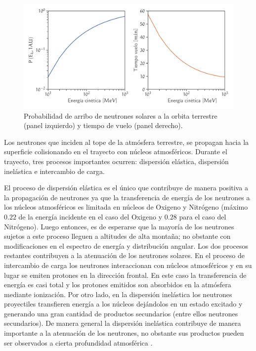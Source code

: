 \begin{figure}
        \centering
        \includegraphics[width=\textwidth]{neutron-prob.pdf}
        \caption{Probabilidad de arribo de neutrones solares a la orbita terrestre (panel izquierdo) y tiempo de vuelo (panel derecho).}
        \label{fig:neutron-prob}
\end{figure}

Los neutrones que inciden al tope de la atmósfera terrestre, se propagan hacia la superficie colisionando en el trayecto con núcleos atmosféricos. Durante el trayecto, tres procesos importantes ocurren: dispersión elástica, dispersión inelástica e intercambio de carga.

El proceso de dispersión elástica es el único que contribuye de manera positiva a la propagación de neutrones ya que la transferencia de energía de los neutrones a los núcleos atmosféricos es limitada en núcleos de Oxigeno y Nitrógeno (máximo $0.22$ de la energía incidente en el caso del Oxigeno y $0.28$ para el caso del Nitrógeno). Luego entonces, es de esperarse que la mayoría de los neutrones sujetos a este proceso lleguen a altitudes de alta montaña; no obstante con modificaciones en el espectro de energía y distribución angular. Los dos procesos restantes contribuyen a la atenuación de los neutrones solares. En el proceso de intercambio de carga los neutrones interaccionan con núcleos atmosféricos y en su lugar se emiten protones en la dirección frontal. En este caso la transferencia de energía es casi total y los protones emitidos son absorbidos en la atmósfera mediante ionización. Por otro lado, en la dispersión inelástica los neutrones proyectiles transfieren energía a los núcleos dejándolos en un estado excitado y generando una gran cantidad de productos secundarios (entre ellos neutrones secundarios). De manera general la dispersión inelástica contribuye de manera importante a la atenuación de los neutrones, no obstante sus productos pueden ser observados a cierta profundidad atmosférica \cite{shibata94}.

